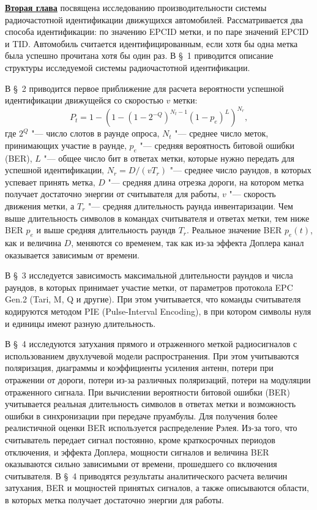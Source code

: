 \underline{\textbf{Вторая глава}} посвящена исследованию производительности системы радиочастотной идентификации движущихся автомобилей. Рассматривается два способа идентификации: по значению EPCID метки, и по паре значений EPCID и TID. Автомобиль считается идентифицированным, если хотя бы одна метка была успешно прочитана хотя бы один раз. В \S~1 приводится описание структуры исследуемой системы радиочастотной идентификации.

В \S~2 приводится первое приближение для расчета вероятности успешной идентификации движущейся со скоростью $v$ метки:
\[
P_t = 1 - \left( 1 - (1 - 2^{-Q})^{N_t-1} (1 - p_e)^L \right)^{N_r},
\]
где $2^Q$ "--- число слотов в раунде опроса, $N_t$ "--- среднее число меток, принимающих участие в раунде, $p_e$ "--- средняя вероятность битовой ошибки (BER), $L$ "--- общее число бит в ответах метки, которые нужно передать для успешной идентификации, $N_r = D / (v T_r)$ "--- среднее число раундов, в которых успевает принять метка, $D$ "--- средняя длина отрезка дороги, на котором метка получает достаточно энергии от считывателя для работы, $v$ "--- скорость движения метки, а $T_r$ "--- средняя длительность раунда инвентаризации. Чем выше длительность символов в командах считывателя и ответах метки, тем ниже BER $p_e$ и выше средняя длительность раундв $T_r$. Реальное значение BER $p_e(t)$, как и величина $D$, меняются со временем, так как из-за эффекта Доплера канал оказывается зависимым от времени.

В \S~3 исследуется зависимость максимальной длительности раундов и числа раундов, в которых принимает участие метки, от параметров протокола EPC Gen.2 (Tari, M, Q и другие). При этом учитывается, что команды считывателя кодируются методом PIE (Pulse-Interval Encoding), в при котором символы нуля и единицы имеют разную длительность.

В \S~4 исследуются затухания прямого и отраженного меткой радиосигналов с использованием двухлучевой модели распространения. При этом учитываются поляризация, диаграммы и коэффициенты усиления антенн, потери при отражении от дороги, потери из-за различных поляризаций, потери на модуляции отраженного сигнала. При вычислении вероятности битовой ошибки (BER) учитывается реальная длительность символов в ответах метки и  возможность ошибки в синхронизации при передаче пруамбулы. Для получения более реалистичной оценки BER используется распределение Рэлея. Из-за того, что считыватель передает сигнал постоянно, кроме краткосрочных периодов отключения, и эффекта Доплера, мощности сигналов и величина BER оказываются сильно зависимыми от времени, прошедшего со включения считывателя. В \S~4 приводятся результаты аналитического расчета величин затухания, BER и мощностей принятых сигналов, а также описываются области, в которых метка получает достаточно энергии для работы.

